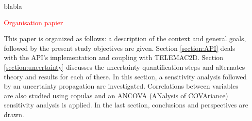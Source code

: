 blabla

\textcolor{red}{Organisation papier}

This paper is organized as follows: a description of the context and general goals, followed by the present study objectives are given. Section \ref{section:API} deals with the API's implementation and coupling with TELEMAC2D. Section \ref{section:uncertainty} discusses the uncertainty quantification steps and alternates theory and results for each of these. In this section, a sensitivity analysis followed by an uncertainty propagation are investigated. Correlations between variables are also studied using copulas and an ANCOVA (ANalysis of COVAriance) sensitivity analysis is applied. In the last section, conclusions and perspectives are drawn.

